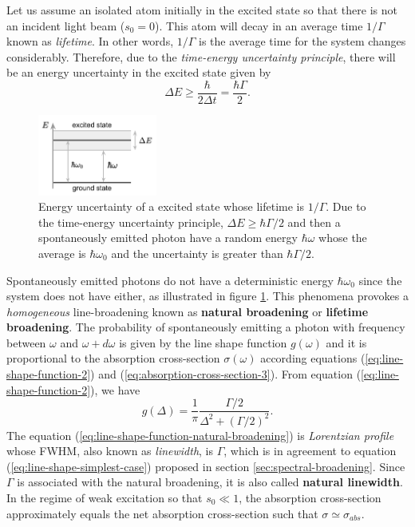 {Let us assume an isolated atom initially in the excited state so that there is not an incident light beam ($ s_0 = 0 $). This atom will decay in an average time $ 1/\Gamma $ known as \textit{lifetime}. In other words, $ 1 / \Gamma $ is the average time for the system changes considerably. Therefore, due to the \textit{time-energy uncertainty principle}, there will be an energy uncertainty in the excited state given by
\begin{equation}
	\Delta E \geq \frac{\hbar}{2\Delta t} = \frac{\hbar\Gamma}{2}.
\end{equation}
\begin{figure}[!ht]
	\centering
	\includegraphics[width=0.35\textwidth]{USPSC-img/natural_broadening.png}
	\caption{Energy uncertainty of a excited state whose lifetime is $ 1/\Gamma $. Due to the time-energy uncertainty principle, $ \Delta E \geq \hbar \Gamma / 2 $ and then a spontaneously emitted photon have a random energy $ \hbar \omega $ whose the average is $ \hbar \omega_0 $ and the uncertainty is greater than $ \hbar \Gamma / 2 $.}
	\label{fig:natural-broadening}
\end{figure}
Spontaneously emitted photons do not have a deterministic energy $ \hbar \omega_0 $ since the system does not have either, as illustrated in figure \ref{fig:natural-broadening}. This phenomena provokes a \textit{homogeneous} line-broadening known as \textbf{natural broadening} or \textbf{lifetime broadening}. The probability of spontaneously emitting a photon with frequency between $ \omega $ and $ \omega + d\omega $ is given by the line shape function $ g(\omega) $ and it is proportional to the absorption cross-section $ \sigma(\omega) $ according equations (\ref{eq:line-shape-function-2}) and (\ref{eq:absorption-cross-section-3}). From equation (\ref{eq:line-shape-function-2}), we have
\begin{equation}
	g(\Delta) = \frac{1}{\pi} \frac{\Gamma / 2}{\Delta^2 + (\Gamma / 2)^2}.
	\label{eq:line-shape-function-natural-broadening}
\end{equation}
The equation (\ref{eq:line-shape-function-natural-broadening}) is \textit{Lorentzian profile} whose FWHM, also known as \textit{linewidth}, is $ \Gamma $, which is in agreement to equation (\ref{eq:line-shape-simplest-case}) proposed in section \ref{sec:spectral-broadening}. Since $ \Gamma $ is associated with the natural broadening, it is also called \textbf{natural linewidth}. In the regime of weak excitation so that $ s_0 \ll 1 $, the absorption cross-section approximately equals the net absorption cross-section such that $ \sigma \simeq \sigma_{abs} $.

}
